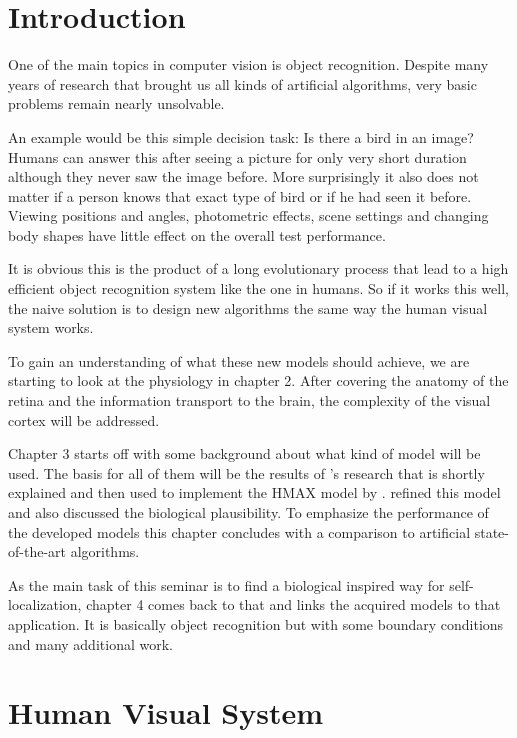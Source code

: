 
\chapter{Introduction}

	One of the main topics in computer vision is object recognition. Despite many years of research that brought us all kinds of artificial algorithms, very basic problems remain nearly unsolvable.
	
	An example would be this simple decision task: Is there a bird in an image? Humans can answer this after seeing a picture for only very short duration although they never saw the image before. More surprisingly it also does not matter if a person knows that exact type of bird or if he had seen it before. Viewing positions and angles, photometric effects, scene settings and changing body shapes have little effect on the overall test performance.
	
	It is obvious this is the product of a long evolutionary process that lead to a high efficient object recognition system like the one in humans. So if it works this well, the naive solution is to design new algorithms the same way the human visual system works.
	
	To gain an understanding of what these new models should achieve, we are starting to look at the physiology in chapter 2. After covering the anatomy of the retina and the information transport to the brain, the complexity of the visual cortex will be addressed.
	
	Chapter 3 starts off with some background about what kind of model will be used. The basis for all of them will be the results of \citeauthor{hubel1962receptive}'s research that is shortly explained and then used to implement the HMAX model by \citeauthor{riesenhuber1999hierarchical}. \citeauthor{serre2007robust} refined this model and also discussed the biological plausibility. To emphasize the performance of the developed models this chapter concludes with a comparison to artificial state-of-the-art algorithms.
	
	As the main task of this seminar is to find a biological inspired way for self-localization, chapter 4 comes back to that and links the acquired models to that application. It is basically object recognition but with some boundary conditions and many additional work.
	
	
\chapter{Human Visual System}

